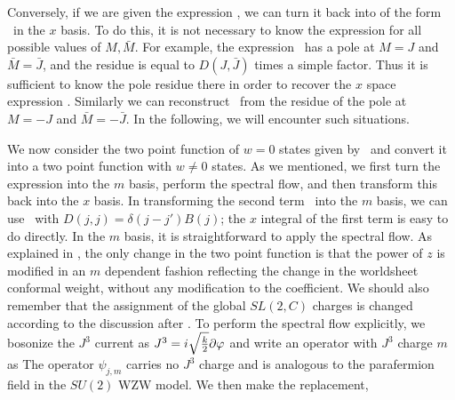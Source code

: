 Conversely, if we are given
the expression \startm , we can turn it back into
of the form \start\ in the $x$ basis. To do this,
it is not necessary to know the
expression for all possible values of $M ,\bar M$.
For example, the expression \startm\ has a pole
at $M=J$ and $\bar M = \bar J$, and the residue
is equal to $D(J,\bar J)$ times a simple factor.
Thus it is sufficient to know the pole residue there in
order to recover the $x$ space expression \start.
Similarly we can reconstruct \start\ from
the residue of the pole at $M=-J$ and $\bar M = - \bar J$.
In the following, we will encounter such situations.


We now consider the two point function of $w=0$ states given
by \teschnertwo\ and convert it into a two point function
with $w\not =0$ states.  As we mentioned, we first turn the expression
 into the $m$ basis,
perform the spectral flow, and then transform this back into
the $x$ basis.
In transforming the second term \teschnertwo\ into the $m$ basis,
 we can use
\startm\ with $D(j,j) = \delta(j-j') B(j)$;
the $x$ integral of the first term is easy to do directly.
In the $m$ basis, it is straightforward to apply the spectral
flow. As explained in \first , the only change in the two point
function is that the power of
$z$ is modified in an $m$ dependent fashion reflecting
the change in the worldsheet conformal weight,
\eqn{}
 without any modification to the coefficient.
We should also remember that the assignment
of the global $SL(2,C)$ charges is changed
according to the discussion after \sfagain.
To perform
the spectral flow explicitly, we bosonize
the $J^3$ current as $J^3 = i\sqrt{{k \over 2}} \partial \varphi$ and
write an operator with $J^3$ charge $m$ as
\eqn{}
The operator $\psi_{j,m}$ carries  no $J^3$ charge and is analogous
to the parafermion field in the $SU(2)$ WZW model.
We then make the replacement,
